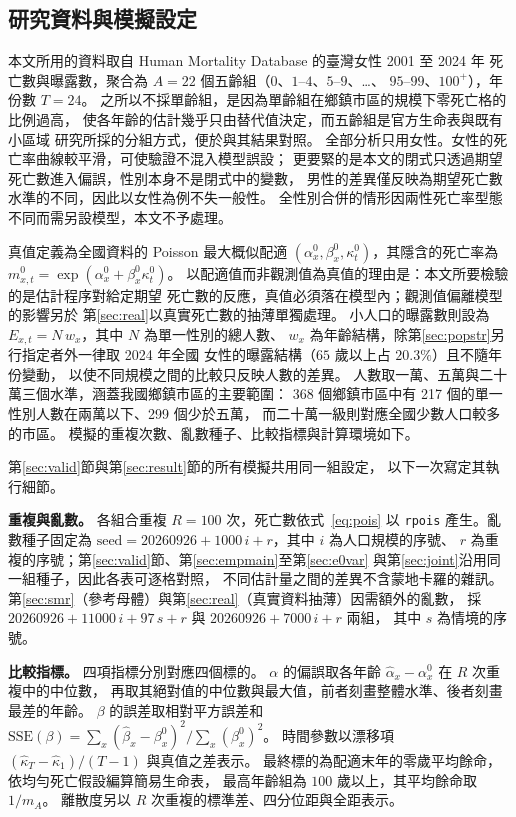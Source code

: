 \documentclass[UTF8, fontset=macnew, a4paper, 12pt]{ctexart}
\begin{document}
\subsection{研究資料與模擬設定}\label{subsec:data}\label{sec:setup}

本文所用的資料取自 Human Mortality Database 的臺灣女性 2001 至 2024 年
死亡數與曝露數，聚合為 $A=22$ 個五齡組（$0$、$1$--$4$、$5$--$9$、\dots、
$95$--$99$、$100^{+}$），年份數 $T=24$。
之所以不採單齡組，是因為單齡組在鄉鎮市區的規模下零死亡格的比例過高，
使各年齡的估計幾乎只由替代值決定，而五齡組是官方生命表與既有小區域
研究所採的分組方式，便於與其結果對照。
全部分析只用女性。女性的死亡率曲線較平滑，可使驗證不混入模型誤設；
更要緊的是本文的閉式只透過期望死亡數進入偏誤，性別本身不是閉式中的變數，
男性的差異僅反映為期望死亡數水準的不同，因此以女性為例不失一般性。
全性別合併的情形因兩性死亡率型態不同而需另設模型，本文不予處理。

真值定義為全國資料的 Poisson 最大概似配適
$(\alpha^{0}_x,\beta^{0}_x,\kappa^{0}_t)$，其隱含的死亡率為
$m^{0}_{x,t}=\exp(\alpha^{0}_x+\beta^{0}_x\kappa^{0}_t)$。
以配適值而非觀測值為真值的理由是：本文所要檢驗的是估計程序對給定期望
死亡數的反應，真值必須落在模型內；觀測值偏離模型的影響另於
第\ref{sec:real}以真實死亡數的抽薄單獨處理。
小人口的曝露數則設為 $E_{x,t}=N\,w_x$，其中 $N$ 為單一性別的總人數、
$w_x$ 為年齡結構，除第\ref{sec:popstr}另行指定者外一律取 2024 年全國
女性的曝露結構（$65$ 歲以上占 $20.3\%$）且不隨年份變動，
以使不同規模之間的比較只反映人數的差異。
人數取一萬、五萬與二十萬三個水準，涵蓋我國鄉鎮市區的主要範圍：
368 個鄉鎮市區中有 217 個的單一性別人數在兩萬以下、299 個少於五萬，
而二十萬一級則對應全國少數人口較多的市區。
模擬的重複次數、亂數種子、比較指標與計算環境如下。


第\ref{sec:valid}節與第\ref{sec:result}節的所有模擬共用同一組設定，
以下一次寫定其執行細節。

\textbf{重複與亂數。} 各組合重複 $R=100$ 次，死亡數依式~\eqref{eq:pois}
以 \texttt{rpois} 產生。亂數種子固定為
$\text{seed}=20260926+1000\,i+r$，其中 $i$ 為人口規模的序號、
$r$ 為重複的序號；第\ref{sec:valid}節、第\ref{sec:empmain}至第\ref{sec:e0var}
與第\ref{sec:joint}沿用同一組種子，因此各表可逐格對照，
不同估計量之間的差異不含蒙地卡羅的雜訊。
第\ref{sec:smr}（參考母體）與第\ref{sec:real}（真實資料抽薄）因需額外的亂數，
採 $20260926+11000\,i+97\,s+r$ 與 $20260926+7000\,i+r$ 兩組，
其中 $s$ 為情境的序號。

\textbf{比較指標。} 四項指標分別對應四個標的。
$\alpha$ 的偏誤取各年齡 $\hat\alpha_x-\alpha^{0}_x$ 在 $R$ 次重複中的中位數，
再取其絕對值的中位數與最大值，前者刻畫整體水準、後者刻畫最差的年齡。
$\beta$ 的誤差取相對平方誤差和
$\mathrm{SSE}(\beta)=\sum_x(\hat\beta_x-\beta^{0}_x)^2\big/\sum_x(\beta^{0}_x)^2$。
時間參數以漂移項 $(\hat\kappa_T-\hat\kappa_1)/(T-1)$ 與真值之差表示。
最終標的為配適末年的零歲平均餘命，依均勻死亡假設編算簡易生命表，
最高年齡組為 $100$ 歲以上，其平均餘命取 $1/m_{A}$。
離散度另以 $R$ 次重複的標準差、四分位距與全距表示。
\end{document}
